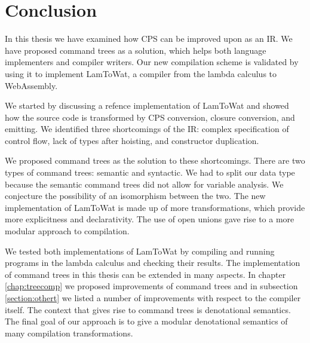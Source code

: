 \chapter{\label{chap:conclusion}Conclusion}

In this thesis we have examined how CPS can be improved upon as an IR. We have proposed command trees as a solution, which helps both language implementers and compiler writers. Our new compilation scheme is validated by using it to implement LamToWat, a compiler from the lambda calculus to WebAssembly. 

We started by discussing a refence implementation of LamToWat and showed how the source code is transformed by CPS conversion, closure conversion, and emitting. We identified three shortcomings of the IR: complex specification of control flow, lack of types after hoisting, and constructor duplication.

We proposed command trees as the solution to these shortcomings. There are two types of command trees: semantic and syntactic. We had to split our data type because the semantic command trees did not allow for variable analysis. We conjecture the possibility of an isomorphism between the two. The new implementation of LamToWat is made up of more transformations, which provide more explicitness and declarativity. The use of open unions gave rise to a more modular approach to compilation.

We tested both implementations of LamToWat by compiling and running programs in the lambda calculus and checking their results. The implementation of command trees in this thesis can be extended in many aspects. In chapter \ref{chap:treecomp} we proposed improvements of command trees and in subsection \ref{section:othert} we listed a number of improvements with respect to the compiler itself. The context that gives rise to command trees is denotational semantics. The final goal of our approach is to give a modular denotational semantics of many compilation transformations.